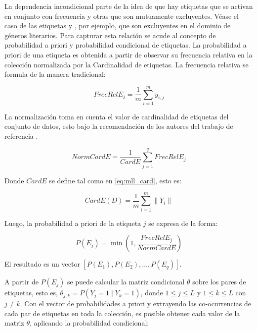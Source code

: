 La dependencia incondicional parte de la idea de que hay etiquetas que se
activan en conjunto con frecuencia y otras que son mutuamente excluyentes. Véase
el caso de las etiquetas  y , por ejemplo, que son excluyentes en el dominio de géneros literarios.
Para capturar esta relación se acude al concepto de probabilidad a priori y
probabilidad condicional de etiquetas. La probabilidad a priori de una etiqueta
es obtenida a partir de observar su frecuencia relativa en la colección
normalizada por la Cardinalidad de etiquetas.  La frecuencia relativa se formula de la manera tradicional:

\begin{equation}
	FrecRelE_{j} = \frac{1}{m} \sum_{i=1}^{m} y_{i,j}
\end{equation}

La normalización toma en cuenta el valor de cardinalidad de etiquetas del
conjunto de datos, esto bajo la recomendación de los autores del trabajo de
referencia \cite{read_scalable_2012}.

\begin{equation}
	NormCardE = \frac{1}{CardE} \sum_{j=1}^{q} FrecRelE_{j}
\end{equation}

Donde $CardE$ se define tal como en \ref{eq:mll_card}, esto es:

\begin{equation}
	CardE(D) = \frac{1}{m} \sum_{i=1}^{m} \left\|Y_{i}\right\|
\end{equation}

Luego, la probabilidad a priori de la etiqueta $j$ se expresa de la forma:

\begin{equation}
	P(E_{j}) =\min{(1, \frac{FrecRelE_{j}}{NormCardE})}
\end{equation}

El resultado es un vector $[P(E_{1}), P(E_{2}),\dots, P(E_{q})]$.

A partir de $P(E_{j})$ se puede calcular la matriz condicional $\theta$ sobre
los pares de etiquetas, esto es, $\theta_{j,k} = P(Y_{j} = 1 \mid Y_{k} = 1)$,
donde  $1 \leq j \leq L$ y $1 \leq k \leq L$ con $j \neq k$.  Con el vector de probabilidades a priori y extrayendo las
co-ocurrencias de cada par de etiquetas en toda la colección, es posible obtener
cada valor de la matriz $\theta$, aplicando la probabilidad condicional:

